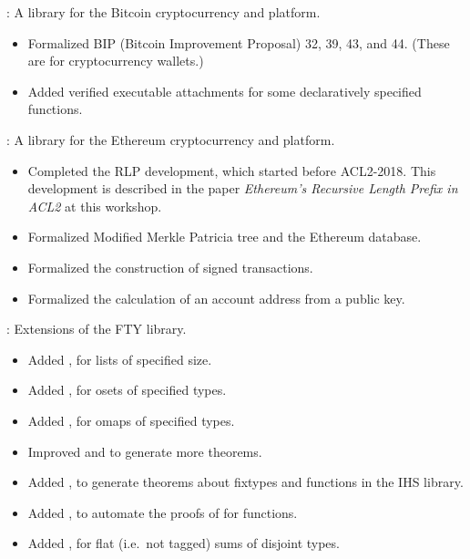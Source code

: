 
\begin{frame}

\implibtitle

:
A library for the Bitcoin cryptocurrency and platform.
\begin{itemize}
\item
Formalized BIP (Bitcoin Improvement Proposal) 32, 39, 43, and 44.
(These are for cryptocurrency wallets.)
\item
Added verified executable attachments
for some declaratively specified functions.
\end{itemize}

\separation

:
A library for the Ethereum cryptocurrency and platform.
\begin{itemize}
\item
Completed the RLP development, which started before ACL2-2018.
This development is described in the paper
\textit{Ethereum's Recursive Length Prefix in ACL2} at this workshop.
\item
Formalized Modified Merkle Patricia tree and the Ethereum database.
\item
Formalized the construction of signed transactions.
\item
Formalized the calculation of an account address from a public key.
\end{itemize}

\end{frame}


\begin{frame}

\implibtitle

:
Extensions of the FTY library.
\begin{itemize}
\item
Added , for lists of specified size.
\item
Added , for osets of specified types.
\item
Added , for omaps of specified types.
\item
Improved  and  to generate more theorems.
\item
Added ,
to generate theorems about  fixtypes
and functions in the IHS library.
\item
Added ,
to automate the proofs of  for  functions.
\item
Added ,
for flat (i.e.\ not tagged) sums of disjoint types.
\end{itemize}

\end{frame}

